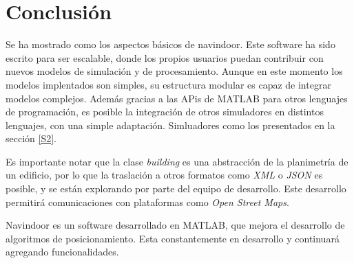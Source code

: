 \section{Conclusión}\label{S5}

Se ha mostrado como los aspectos básicos de navindoor. Este software ha sido escrito para ser escalable, donde los propios usuarios puedan contribuir con nuevos modelos de simulación y de procesamiento. Aunque en este momento los modelos implentados son simples, su estructura modular es capaz de integrar modelos complejos. Además gracias a las APis de MATLAB para otros lenguajes de programación, es posible la integración de otros simuladores en distintos lenguajes, con una simple adaptación. Simluadores como los presentados en la sección \ref{S2}.

Es importante notar que la clase \emph{building} es una abstracción de la planimetría de un edificio, por lo que la traslación a otros formatos como \emph{XML} o \emph{JSON} es posible, y se están explorando por parte del equipo de desarrollo. Este desarrollo permitirá comunicaciones con plataformas como \emph{Open Street Maps}.

Navindoor es un software desarrollado en MATLAB, que mejora el desarrollo de algoritmos de posicionamiento. Esta constantemente en desarrollo y continuará agregando funcionalidades.